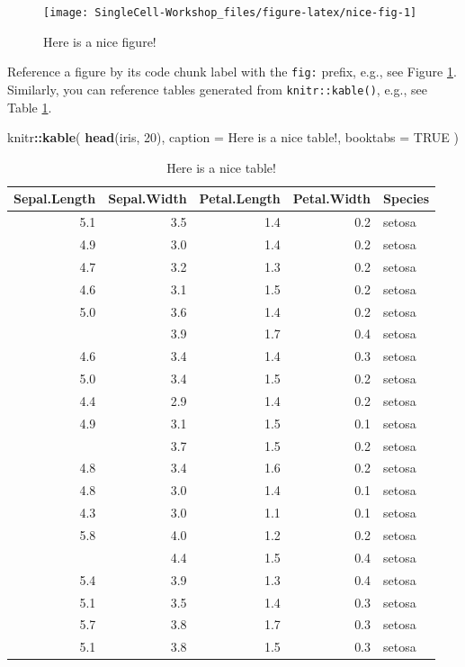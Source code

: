 \documentclass[
]{book}
\newenvironment{Shaded}{\begin{snugshade}}{\end{snugshade}}
\newcommand{\DataTypeTok}[1]{\textcolor[rgb]{0.13,0.29,0.53}{#1}}
\newcommand{\DecValTok}[1]{\textcolor[rgb]{0.00,0.00,0.81}{#1}}
\newcommand{\KeywordTok}[1]{\textcolor[rgb]{0.13,0.29,0.53}{\textbf{#1}}}
\newcommand{\NormalTok}[1]{#1}
\newcommand{\OperatorTok}[1]{\textcolor[rgb]{0.81,0.36,0.00}{\textbf{#1}}}
\newcommand{\OtherTok}[1]{\textcolor[rgb]{0.56,0.35,0.01}{#1}}
\newcommand{\StringTok}[1]{\textcolor[rgb]{0.31,0.60,0.02}{#1}}
\begin{document}
\begin{figure}

{\centering \texttt{[image: SingleCell-Workshop\_files/figure-latex/nice-fig-1]} 

}

\caption{Here is a nice figure!}\label{fig:nice-fig}
\end{figure}

Reference a figure by its code chunk label with the \texttt{fig:} prefix, e.g., see Figure \ref{fig:nice-fig}. Similarly, you can reference tables generated from \texttt{knitr::kable()}, e.g., see Table \ref{tab:nice-tab}.

\begin{Shaded}
\begin{Highlighting}[]
\NormalTok{knitr}\OperatorTok{::}\KeywordTok{kable}\NormalTok{(}
  \KeywordTok{head}\NormalTok{(iris, }\DecValTok{20}\NormalTok{), }\DataTypeTok{caption =} \StringTok{\textquotesingle{}Here is a nice table!\textquotesingle{}}\NormalTok{,}
  \DataTypeTok{booktabs =} \OtherTok{TRUE}
\NormalTok{)}
\end{Highlighting}
\end{Shaded}

\begin{table}

\caption{\label{tab:nice-tab}Here is a nice table!}
\centering
\begin{tabular}[t]{rrrrl}
\toprule
Sepal.Length & Sepal.Width & Petal.Length & Petal.Width & Species\\
\midrule
5.1 & 3.5 & 1.4 & 0.2 & setosa\\
4.9 & 3.0 & 1.4 & 0.2 & setosa\\
4.7 & 3.2 & 1.3 & 0.2 & setosa\\
4.6 & 3.1 & 1.5 & 0.2 & setosa\\
5.0 & 3.6 & 1.4 & 0.2 & setosa\\
\addlinespace
5.4 & 3.9 & 1.7 & 0.4 & setosa\\
4.6 & 3.4 & 1.4 & 0.3 & setosa\\
5.0 & 3.4 & 1.5 & 0.2 & setosa\\
4.4 & 2.9 & 1.4 & 0.2 & setosa\\
4.9 & 3.1 & 1.5 & 0.1 & setosa\\
\addlinespace
5.4 & 3.7 & 1.5 & 0.2 & setosa\\
4.8 & 3.4 & 1.6 & 0.2 & setosa\\
4.8 & 3.0 & 1.4 & 0.1 & setosa\\
4.3 & 3.0 & 1.1 & 0.1 & setosa\\
5.8 & 4.0 & 1.2 & 0.2 & setosa\\
\addlinespace
5.7 & 4.4 & 1.5 & 0.4 & setosa\\
5.4 & 3.9 & 1.3 & 0.4 & setosa\\
5.1 & 3.5 & 1.4 & 0.3 & setosa\\
5.7 & 3.8 & 1.7 & 0.3 & setosa\\
5.1 & 3.8 & 1.5 & 0.3 & setosa\\
\bottomrule
\end{tabular}
\end{table}
\end{document}
